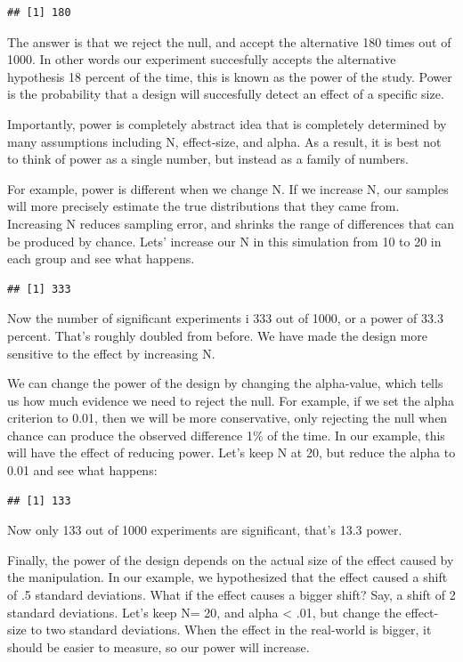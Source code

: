 \documentclass[]{book}
\begin{document}
\begin{verbatim}
## [1] 180
\end{verbatim}

The answer is that we reject the null, and accept the alternative 180 times out of 1000. In other words our experiment succesfully accepts the alternative hypothesis 18 percent of the time, this is known as the power of the study. Power is the probability that a design will succesfully detect an effect of a specific size.

Importantly, power is completely abstract idea that is completely determined by many assumptions including N, effect-size, and alpha. As a result, it is best not to think of power as a single number, but instead as a family of numbers.

For example, power is different when we change N. If we increase N, our samples will more precisely estimate the true distributions that they came from. Increasing N reduces sampling error, and shrinks the range of differences that can be produced by chance. Lets' increase our N in this simulation from 10 to 20 in each group and see what happens.

\begin{verbatim}
## [1] 333
\end{verbatim}

Now the number of significant experiments i 333 out of 1000, or a power of 33.3 percent. That's roughly doubled from before. We have made the design more sensitive to the effect by increasing N.

We can change the power of the design by changing the alpha-value, which tells us how much evidence we need to reject the null. For example, if we set the alpha criterion to 0.01, then we will be more conservative, only rejecting the null when chance can produce the observed difference 1\% of the time. In our example, this will have the effect of reducing power. Let's keep N at 20, but reduce the alpha to 0.01 and see what happens:

\begin{verbatim}
## [1] 133
\end{verbatim}

Now only 133 out of 1000 experiments are significant, that's 13.3 power.

Finally, the power of the design depends on the actual size of the effect caused by the manipulation. In our example, we hypothesized that the effect caused a shift of .5 standard deviations. What if the effect causes a bigger shift? Say, a shift of 2 standard deviations. Let's keep N= 20, and alpha \textless{} .01, but change the effect-size to two standard deviations. When the effect in the real-world is bigger, it should be easier to measure, so our power will increase.
\end{document}

